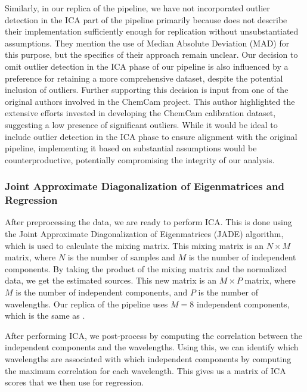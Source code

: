Similarly, in our replica of the pipeline, we have not incorporated outlier detection in the ICA part of the pipeline primarily because \citet{cleggRecalibrationMarsScience2017} does not describe their implementation sufficiently enough for replication without unsubstantiated assumptions.
They mention the use of Median Absolute Deviation (MAD) for this purpose, but the specifics of their approach remain unclear.
Our decision to omit outlier detection in the ICA phase of our pipeline is also influenced by a preference for retaining a more comprehensive dataset, despite the potential inclusion of outliers.
Further supporting this decision is input from one of the original authors involved in the ChemCam project.
This author highlighted the extensive efforts invested in developing the ChemCam calibration dataset, suggesting a low presence of significant outliers.
While it would be ideal to include outlier detection in the ICA phase to ensure alignment with the original pipeline, implementing it based on substantial assumptions would be counterproductive, potentially compromising the integrity of our analysis.

\subsubsection{Joint Approximate Diagonalization of Eigenmatrices and Regression}
After preprocessing the data, we are ready to perform ICA.
This is done using the Joint Approximate Diagonalization of Eigenmatrices (JADE) algorithm, which is used to calculate the mixing matrix.
This mixing matrix is an $N \times M$ matrix, where $N$ is the number of samples and $M$ is the number of independent components.
By taking the product of the mixing matrix and the normalized data, we get the estimated sources.
This new matrix is an $M \times P$ matrix, where $M$ is the number of independent components, and $P$ is the number of wavelengths.
Our replica of the pipeline uses $M = 8$ independent components, which is the same as \citet{cleggRecalibrationMarsScience2017}.

After performing ICA, we post-process by computing the correlation between the independent components and the wavelengths.
Using this, we can identify which wavelengths are associated with which independent components by computing the maximum correlation for each wavelength.
This gives us a matrix of ICA scores that we then use for regression.

